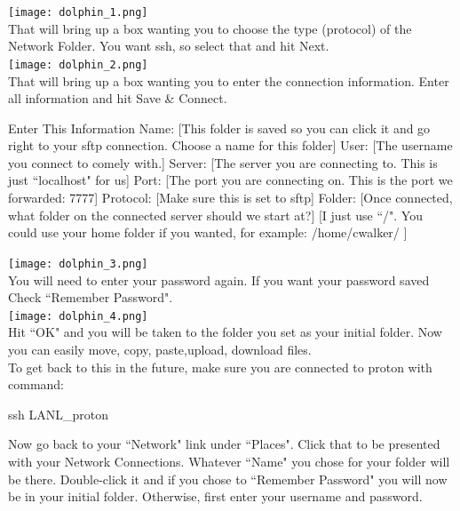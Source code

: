 \documentclass[titlepage]{article}
\newcommand\infoC{\faInfoCircle}
\begin{document}
\texttt{[image: dolphin\_1.png]} \\

That will bring up a box wanting you to choose the type (protocol) of the Network Folder.
You want ssh, so select that and hit Next. \\

\texttt{[image: dolphin\_2.png]} \\

\pagebreak
That will bring up a box wanting you to enter the connection information.
Enter all information and hit Save \& Connect.\\
\begin{explanation}{\infoC}{Enter This Information}
Name:		[This folder is saved so you can click it and go right to your sftp connection.
			Choose a name for this folder]
User:		[The username you connect to comely with.]
Server:		[The server you are connecting to.  This is just ``localhost" for us]
Port:		[The port you are connecting on.  This is the port we forwarded: 7777]
Protocol:	[Make sure this is set to sftp]
Folder:		[Once connected, what folder on the connected server should we start at?]
		[I just use ``/". You could use your home folder if you wanted, for example: /home/cwalker/ ]
\end{explanation}

\texttt{[image: dolphin\_3.png]}\\

You will need to enter your password again.  If you want your password saved Check ``Remember Password". \\

\texttt{[image: dolphin\_4.png]} \\

Hit ``OK" and you will be taken to the folder you set as your initial folder.  Now you can easily move, copy, paste,upload, download files.
\\

To get back to this in the future, make sure you are connected to proton with command:
\begin{terminal}
ssh LANL_proton
\end{terminal}
Now go back to your ``Network" link under ``Places".  Click that to be presented with your
Network Connections.  Whatever ``Name" you chose for your folder will be there.  Double-click it and if you chose to ``Remember
Password" you will now be in your initial folder.  Otherwise, first enter your username and password. \\
\end{document}
